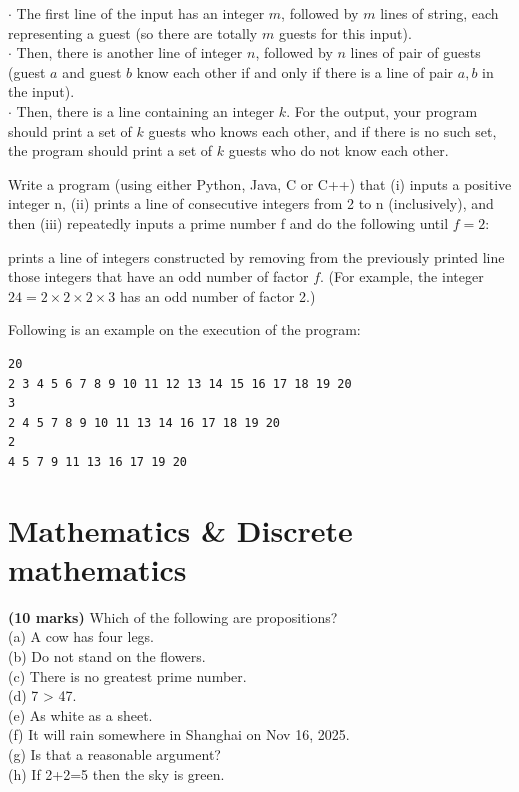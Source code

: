 \documentclass{article}
\begin{document}
\indent $\cdot$ The first line of the input has an integer $m$, followed by $m$ lines of string, each representing a guest (so there are totally $m$ guests for this input).\\
\indent $\cdot$ Then, there is another line of integer $n$, followed by $n$ lines of pair of guests (guest $a$ and guest $b$ know each other if and only if there is a line of pair $a, b$ in the input).\\
\indent $\cdot$ Then, there is a line containing an integer $k$.
For the output, your program should print a set of $k$ guests who knows each other, and if there is no such set, the program should print a set of $k$ guests who do not know each other.\\

\vspace{2\baselineskip}

\noindent Write a program (using either Python, Java, C or C++) that (i) inputs a positive integer n, (ii) prints a line of consecutive integers from 2 to n (inclusively), and then (iii) repeatedly inputs a prime number f and do the following until $f = 2$:

prints a line of integers constructed by removing from the previously printed line those integers that have an odd number of factor $f$. (For example, the integer $24 = 2 \times 2 \times 2 \times 3$ has an odd number of factor 2.)

Following is an example on the execution of the program:
\begin{lstlisting}
20 
2 3 4 5 6 7 8 9 10 11 12 13 14 15 16 17 18 19 20 
3 
2 4 5 7 8 9 10 11 13 14 16 17 18 19 20 
2 
4 5 7 9 11 13 16 17 19 20 
\end{lstlisting}

\vspace{1\baselineskip}


\section{Mathematics \& Discrete mathematics}

\noindent \textbf{(10 marks)} Which of the following are propositions? \\
\indent (a) A cow has four legs.\\
\indent (b) Do not stand on the flowers.\\
\indent (c) There is no greatest prime number.\\
\indent (d) 7 > 47.\\
\indent (e) As white as a sheet.\\
\indent (f) It will rain somewhere in Shanghai on Nov 16, 2025.\\
\indent (g) Is that a reasonable argument?\\
\indent (h) If 2+2=5 then the sky is green.\\
\end{document}
